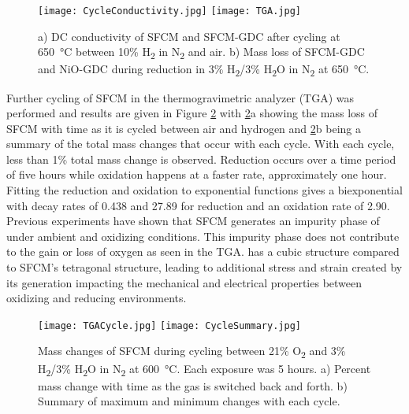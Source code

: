         \begin{figure}
          \texttt{[image: CycleConductivity.jpg]}
          \texttt{[image: TGA.jpg]}
          \caption{a) DC conductivity of SFCM and SFCM-GDC after cycling at \SI{650}{\celsius} between 10\% H\textsubscript{2} in N\textsubscript{2} and air. b) Mass loss of SFCM-GDC and NiO-GDC during reduction in 3\% H\textsubscript{2}/3\% H\textsubscript{2}O in N\textsubscript{2} at \SI{650}{\celsius}.}
          \label{fig:TGA}
        \end{figure}

        Further cycling of SFCM in the thermogravimetric analyzer (TGA) was performed and results are given in Figure \ref{fig:Cycled} with \ref{fig:Cycled}a showing the mass loss of SFCM with time as it is cycled between air and hydrogen and \ref{fig:Cycled}b being a summary of the total mass changes that occur with each cycle.
        With each cycle, less than 1\% total mass change is observed.
        Reduction occurs over a time period of five hours while oxidation happens at a faster rate, approximately one hour.
        Fitting the reduction and oxidation to exponential functions gives a biexponential with decay rates of 0.438 and 27.89 for reduction and an oxidation rate of 2.90.
        Previous experiments have shown that SFCM generates an impurity phase of  under ambient and oxidizing conditions.\cite{Stanley2018}
        This impurity phase does not contribute to the gain or loss of oxygen as seen in the TGA.
         has a cubic structure compared to SFCM's tetragonal structure, leading to additional stress and strain created by its generation impacting the mechanical and electrical properties between oxidizing and reducing environments.

        \begin{figure}
          \texttt{[image: TGACycle.jpg]}
          \texttt{[image: CycleSummary.jpg]}
          \caption{Mass changes of SFCM during cycling between 21\% O\textsubscript{2} and 3\% H\textsubscript{2}/3\% H\textsubscript{2}O in N\textsubscript{2} at \SI{600}{\celsius}. Each exposure was 5 hours. a) Percent mass change with time as the gas is switched back and forth. b) Summary of maximum and minimum changes with each cycle.}
          \label{fig:Cycled}
        \end{figure}

